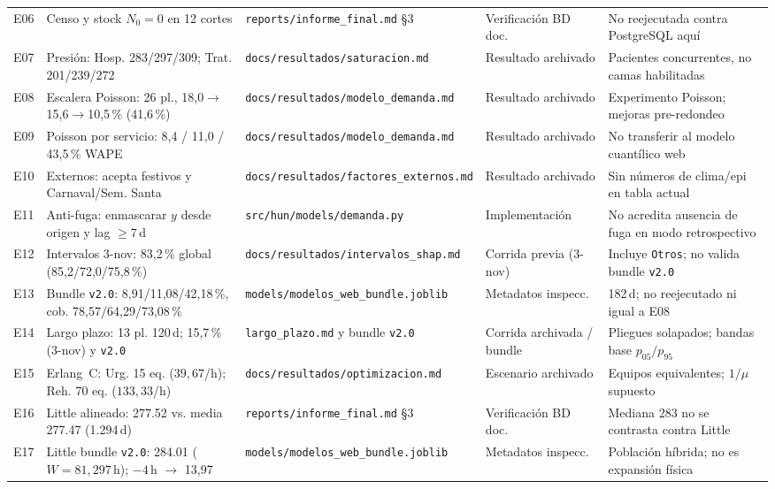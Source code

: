 {\begin{longtable}{@{}L{0.05\textwidth} L{0.25\textwidth} L{0.25\textwidth} L{0.15\textwidth} L{0.24\textwidth}@{}}
E06 & Censo y stock $N_0=0$ en 12 cortes & \nolinkurl{reports/informe_final.md} \S3 & Verificación BD doc. & No reejecutada contra PostgreSQL aquí \\
E07 & Presión: Hosp. 283/297/309; Trat. 201/239/272 & \nolinkurl{docs/resultados/saturacion.md} & Resultado archivado & Pacientes concurrentes, no camas habilitadas \\
E08 & Escalera Poisson: 26 pl., 18,0$\rightarrow$15,6$\rightarrow$10,5\,\% (41,6\,\%) & \nolinkurl{docs/resultados/modelo_demanda.md} & Resultado archivado & Experimento Poisson; mejoras pre-redondeo \\
E09 & Poisson por servicio: 8,4 / 11,0 / 43,5\,\% WAPE & \nolinkurl{docs/resultados/modelo_demanda.md} & Resultado archivado & No transferir al modelo cuantílico web \\
E10 & Externos: acepta festivos y Carnaval/Sem. Santa & \nolinkurl{docs/resultados/factores_externos.md} & Resultado archivado & Sin números de clima/epi en tabla actual \\
E11 & Anti-fuga: enmascarar $y$ desde origen y lag $\ge 7$\,d & \nolinkurl{src/hun/models/demanda.py} & Implementación & No acredita ausencia de fuga en modo retrospectivo \\
E12 & Intervalos 3-nov: 83,2\,\% global (85,2/72,0/75,8\,\%) & \nolinkurl{docs/resultados/intervalos_shap.md} & Corrida previa (3-nov) & Incluye \texttt{Otros}; no valida bundle \texttt{v2.0} \\
E13 & Bundle \texttt{v2.0}: 8,91/11,08/42,18\,\%, cob. 78,57/64,29/73,08\,\% & \nolinkurl{models/modelos_web_bundle.joblib} & Metadatos inspecc. & 182\,d; no reejecutado ni igual a E08 \\
E14 & Largo plazo: 13 pl. 120\,d; 15,7\,\% (3-nov) y \texttt{v2.0} & \nolinkurl{largo_plazo.md} y bundle \texttt{v2.0} & Corrida archivada / bundle & Pliegues solapados; bandas base $p_{05}/p_{95}$ \\
E15 & Erlang~C: Urg. 15 eq. ($39{,}67$/h); Reh. 70 eq. ($133{,}33$/h) & \nolinkurl{docs/resultados/optimizacion.md} & Escenario archivado & Equipos equivalentes; $1/\mu$ supuesto \\
E16 & Little alineado: \num{277,52} vs. media \num{277,47} (1.294\,d) & \nolinkurl{reports/informe_final.md} \S3 & Verificación BD doc. & Mediana 283 no se contrasta contra Little \\
E17 & Little bundle \texttt{v2.0}: \num{284,01} ($W=81{,}297$\,h); $-4$\,h $\rightarrow$ 13,97 & \nolinkurl{models/modelos_web_bundle.joblib} & Metadatos inspecc. & Población híbrida; no es expansión física \\

\end{longtable}}
